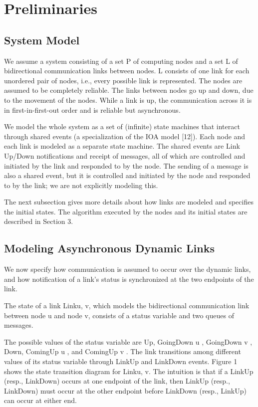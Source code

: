 \chapter{Preliminaries}

\section{System Model}
We assume a system consisting of a set P of computing nodes and a set L of bidirectional communication links between nodes. L consists of one link for each unordered pair of nodes, i.e., every possible link is represented. The nodes are assumed to be completely reliable. The links between nodes go up and down, due to the movement of the nodes. While a link is up, the communication across it is in first-in-first-out order and is reliable but asynchronous.

We model the whole system as a set of (infinite) state machines that interact through shared events (a specialization of the IOA model [12]). Each node and each link is modeled as a separate state machine. The shared events are Link Up/Down notifications and receipt of messages, all of which are controlled and initiated by the link and responded to by the node. The sending of a message is also a shared event, but it is controlled and initiated by the node and responded to by the link; we are not explicitly modeling this.

The next subsection gives more details about how links are modeled and specifies the initial states. The algorithm executed by the nodes and its initial states are described in Section 3.
\section{Modeling Asynchronous Dynamic Links}
We now specify how communication is assumed to occur over the dynamic links, and how notification of a link’s status is synchronized at the two endpoints of the link.

The state of a link Link{u, v}, which models the bidirectional communication link between node u and node v, consists of a status variable and two queues of messages.

The possible values of the status variable are Up, GoingDown u , GoingDown v , Down, ComingUp u , and ComingUp v . The link transitions among different values of its status variable through LinkUp and LinkDown events. Figure 1 shows the state transition diagram for Link{u, v}. The intuition is that if a LinkUp (resp., LinkDown) occurs at one endpoint of the link, then LinkUp (resp., LinkDown) must occur at the other endpoint before LinkDown (resp., LinkUp) can occur at either end.

